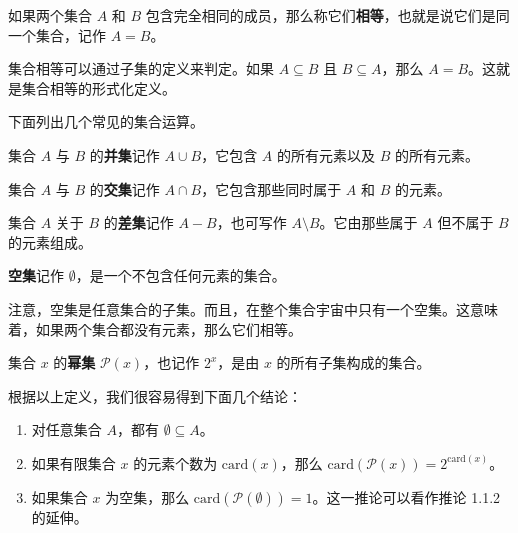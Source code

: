 \begin{definition}[相等]
如果两个集合 $A$ 和 $B$ 包含完全相同的成员，那么称它们\textbf{相等}，也就是说它们是同一个集合，记作 $A=B$。
\end{definition}

集合相等可以通过子集的定义来判定。如果 $A \subseteq B$ 且 $B \subseteq A$，那么 $A=B$。这就是集合相等的形式化定义。

下面列出几个常见的集合运算。

\begin{definition}[集合并]
集合 $A$ 与 $B$ 的\textbf{并集}记作 $A\cup B$，它包含 $A$ 的所有元素以及 $B$ 的所有元素。
\end{definition}

\begin{definition}[集合交]
集合 $A$ 与 $B$ 的\textbf{交集}记作 $A\cap B$，它包含那些同时属于 $A$ 和 $B$ 的元素。
\end{definition}

\begin{definition}[集合差]
集合 $A$ 关于 $B$ 的\textbf{差集}记作 $A-B$，也可写作 $A\setminus B$。它由那些属于 $A$ 但不属于 $B$ 的元素组成。
\end{definition}

\begin{definition}[空集]
\textbf{空集}记作 $\emptyset$，是一个不包含任何元素的集合。
\end{definition}

注意，空集是任意集合的子集。而且，在整个集合宇宙中只有一个空集。这意味着，如果两个集合都没有元素，那么它们相等。

\begin{definition}[幂集]
集合 $x$ 的\textbf{幂集} $\mathcal{P}(x)$，也记作 $2^x$，是由 $x$ 的所有子集构成的集合。
\end{definition}

根据以上定义，我们很容易得到下面几个结论：

\begin{inference}
\begin{enumerate}
\item 对任意集合 $A$，都有 $\emptyset \subseteq A$。

\item 如果有限集合 $x$ 的元素个数为 $\text{card}(x)$，那么
$\text{card}(\mathcal{P}(x))=2^{\text{card}(x)}$。

\item 如果集合 $x$ 为空集，那么 $\text{card}(\mathcal{P}(\emptyset))=1$。这一推论可以看作推论 1.1.2 的延伸。
\end{enumerate}
\end{inference}

